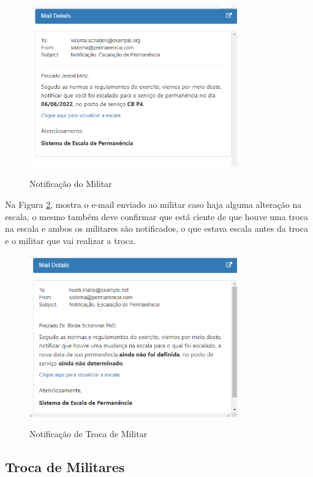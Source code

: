 \begin{figure}[H]
    \centering
    \caption{Notificação do Militar}
    \includegraphics[width=0.8\textwidth]{images/6 - Email enviado.png}
    \label{fig:notification}
\end{figure}

Na Figura \ref{fig:notificationreplace}, mostra o e-mail enviado ao militar caso haja alguma alteração na escala, o mesmo também deve confirmar que está ciente de que houve uma troca na escala e ambos os militares são notificados, o que estava escala antes da troca e o militar que vai realizar a troca.

\begin{figure}[H]
    \centering
    \caption{Notificação de Troca de Militar}
    \includegraphics[width=0.8\textwidth]{images/6 - Email enviado Troca.png}
    \label{fig:notificationreplace}
\end{figure}

\subsection{Troca de Militares}

